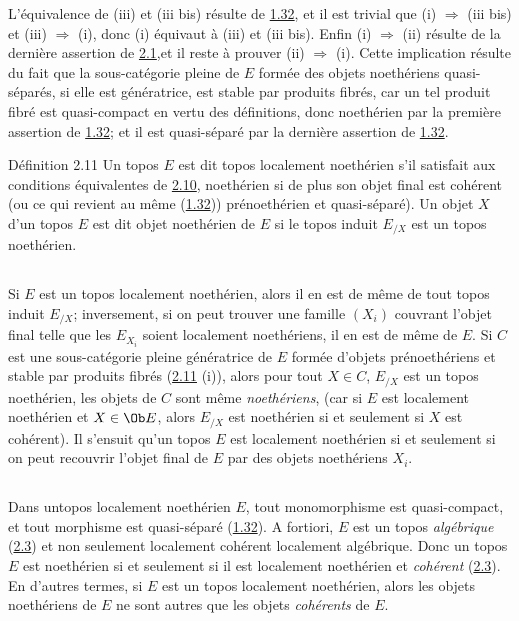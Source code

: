 L'équivalence de (iii) et (iii bis) résulte de \hyperref[VI.subsec1.32]{1.32},
et il est trivial que (i) $\Rightarrow$ (iii bis) et (iii)
$\Rightarrow$ (i), donc (i) équivaut à (iii) et (iii bis). Enfin (i)
$\Rightarrow$ (ii) résulte de la dernière assertion de
\hyperref[VI.prop2.1]{2.1},\pageoriginale et il reste à prouver (ii)
$\Rightarrow$ (i). Cette implication résulte du fait que la
sous-catégorie pleine de $E$ formée des objets noethériens
quasi-séparés, si elle est génératrice, est stable par produits
fibrés, car un tel produit fibré est quasi-compact en vertu des
définitions, donc noethérien par la première assertion de
\hyperref[VI.subsec1.32]{1.32}; et il est quasi-séparé par la dernière
assertion de \hyperref[VI.subsec1.32]{1.32}.

\begin{enonce*}{Définition 2.11}
Un topos $E$ est dit topos localement noethérien s'il satisfait aux
conditions équivalentes de \hyperref[VI.prop2.10]{2.10}, noethérien si de
plus son objet final
est cohérent (ou ce qui revient au même (\hyperref[VI.subsec1.32]{1.32}))
prénoethérien et
quasi-séparé). Un objet $X$ d'un topos $E$ est dit objet
noethérien de
$E$ si le topos induit $E_{/X}$ est un topos noethérien.
\end{enonce*}

\setcounter{subsection}{11}
\subsection{}
Si $E$ est un topos localement noethérien, alors il en est de même de
tout topos induit $E_{/X}$; inversement, si on peut trouver une
famille $(X_i)$ couvrant l'objet final telle que les $E_{X_i}$ soient
localement noethériens, il en est de même de $E$. Si $C$ est une
sous-catégorie pleine génératrice de $E$ formée d'objets
prénoethériens et stable par produits fibrés (\hyperref[VI.def2.11]{2.11} (i)), alors pour
tout $X \in C$, $E_{/X}$ est un topos noethérien, \ie les objets de
$C$ sont même \emph{noethériens}, (car si $E$ est localement
noethérien et $X \in \Ob E$, alors $E_{/X}$ est noethérien si et
seulement si $X$ est cohérent). Il s'ensuit qu'un topos $E$ est
localement noethérien si et seulement si on peut recouvrir l'objet
final de $E$ par des objets noethériens $X_i$.

\subsection{}
Dans un\pageoriginale topos localement noethérien $E$, tout monomorphisme est
quasi-compact, et tout morphisme est quasi-séparé (\hyperref[VI.subsec1.32]{1.32}). A fortiori,
$E$ est un topos \emph{algébrique} (\hyperref[VI.def2.3]{2.3}) et non seulement localement
cohérent \ie localement algébrique. Donc un topos $E$ est noethérien
si et seulement si il est localement noethérien et \emph{cohérent}
(\hyperref[VI.def2.3]{2.3}). En d'autres termes, si $E$ est un topos localement noethérien,
alors les objets noethériens de $E$ ne sont autres que les objets
\emph{cohérents} de $E$.

